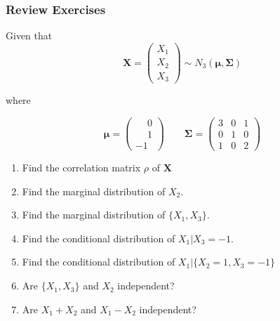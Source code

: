 \documentclass{beamer}
\begin{document}
\begin{frame}
\frametitle{Review Exercises}
Given that 
$$\mathbf{X} =  
\begin{pmatrix}
X_1\\
X_2\\
X_3
\end{pmatrix}
\sim N_3(\mathbf{\mu}, \mathbf{\Sigma}) 
$$

where

$$\mathbf{\mu} = 
\begin{pmatrix}
\phantom{-}0\\
\phantom{-}1\\
-1
\end{pmatrix}
\qquad 
\mathbf{\Sigma} =  
\begin{pmatrix}
3 & 0 & 1\\
0 & 1 & 0\\
1 & 0 & 2
\end{pmatrix}
$$

\begin{enumerate}

\item Find the correlation matrix $\rho$ of $\mathbf{X}$\\
\item Find the marginal distribution of $X_2$.\\

\item Find the marginal distribution of $\{X_1, X_3\}$.\\

\item Find the conditional distribution of $X_1|X_3 = -1$.\\

\item Find the conditional distribution of $X_1|\{X_2 = 1, X_3 = -1\}$\\

\item Are $\{X_1, X_3\}$ and $X_2$ independent?\\

\item Are $X_1 + X_2$ and $X_1 - X_2$ independent?\\  
\end{enumerate}

\end{frame}
\end{document}
